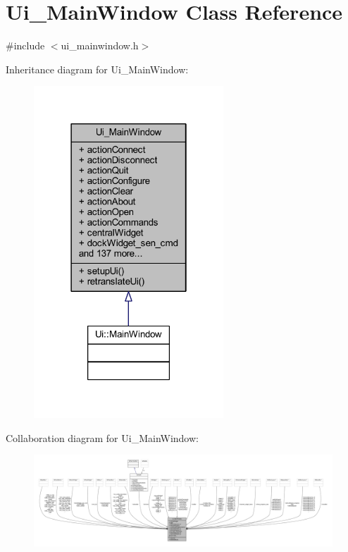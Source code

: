 \hypertarget{a00027}{\section{Ui\+\_\+\+Main\+Window Class Reference}
\label{a00027}
}


{\ttfamily \#include $<$ui\+\_\+mainwindow.\+h$>$}



Inheritance diagram for Ui\+\_\+\+Main\+Window\+:
\nopagebreak
\begin{figure}[H]
\begin{center}
\leavevmode
\includegraphics[width=202pt]{d0/d39/a00314}
\end{center}
\end{figure}


Collaboration diagram for Ui\+\_\+\+Main\+Window\+:
\nopagebreak
\begin{figure}[H]
\begin{center}
\leavevmode
\includegraphics[width=350pt]{d4/d6f/a00315}
\end{center}
\end{figure}
